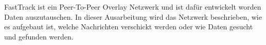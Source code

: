 FastTrack ist ein Peer-To-Peer Overlay Netzwerk und ist dafür entwickelt worden Daten auszutauschen. 
In dieser Ausarbeitung wird das Netzwerk beschrieben, wie es aufgebaut ist, welche Nachrichten verschickt werden oder wie Daten gesucht und gefunden werden.